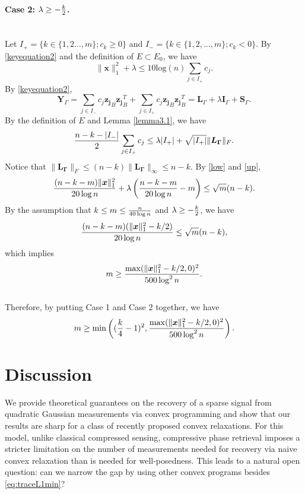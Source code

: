 \documentclass[11pt]{article}
\newcommand{\<}{\langle}
\renewcommand{\>}{\rangle}
\newcommand{\vct}[1]{\bm{#1}}
\newcommand{\mtx}[1]{\bm{#1}}
\numberwithin{equation}{section}
\begin{document}
\paragraph{Case 2:  $\lambda \geq -{k\over2}$.}~~\\ 
Let $I_+ = \{k \in \{1,2\ldots,m\}; c_k \geq 0\} $ and $I_- = \{k \in 
\{1,2,\ldots,m \}; c_k < 0\} $. By \eqref{keyequation2} and the definition of $E \subset E_0$, we have
\begin{equation}
\label{low}
\|\vct{x}\|_1^2+\lambda\leq 10 \text{log}(n) \sum_{j \in I_+}c_j .
\end{equation}
By \eqref{keyequation2},
\[
\mtx{Y}_\Gamma=\sum_{j \in I_-}c_j {\vct{z_j }}_B{\vct{z_j}}_B^T +\sum_{j \in I_+}c_j {\vct{z_j }}_B{\vct{z_j}}_B^T = \mtx{L}_\Gamma + \lambda \mtx{I}_\Gamma + \mtx{S}_\Gamma.
\]
By the definition of $E$ and Lemma \ref{lemma3.1}, we have
\begin{equation}
\label{up}
{{n-k-|I_-|}\over 2}\sum_{j \in I_+}c_j \leq \lambda |I_+|+\sqrt{|I_+|}\|\mtx{L_\Gamma}\|_F.
\end{equation}
Notice that $\|\mtx{L_\Gamma}\|_F\leq (n-k)\|\mtx{L_\Gamma}\|_\infty\leq n-k$. By \eqref{low} and \eqref{up},
\[
{{(n-k-m)\|\vct{x}\|_1^2}\over{20\log n}}+\lambda\left({{n-k-m}\over{20\log n}}-m\right)\leq \sqrt{m}(n-k).
\]
By the assumption that $k\leq m \leq {n\over{40\log n}}$ and $\lambda \geq -{k\over2}$, we have 
\[
{{(n-k-m)(\|\vct{x}\|_1^2-k/2)}\over{20\log n}}\leq \sqrt{m}(n-k),
\]
which implies
\[
m\geq  {{\max(\|\vct{x}\|_1^2-k/2, 0)^2}\over{500\log^2 n}}.
\]
\\
Therefore, by putting Case 1 and Case 2 together, we have
\[
m\geq  \min\left(({k\over 4}-1)^2, {{\max(\|\vct{x}\|_1^2-k/2, 0)^2}\over{500\log^2 n}}\right).
\]






\section{Discussion}
We provide theoretical guarantees on the recovery of a sparse signal from quadratic Gaussian measurements via convex programming and show that our results are sharp for a class of recently proposed convex relaxations. For this model, unlike classical compressed sensing, compressive phase retrieval imposes a stricter limitation on the number of measurements needed for recovery via naive convex relaxation than is needed for well-posedness. This leads to a natural open question: can we narrow the gap by using other convex programs besides \eqref{eq:traceL1min}?\\
\end{document}
